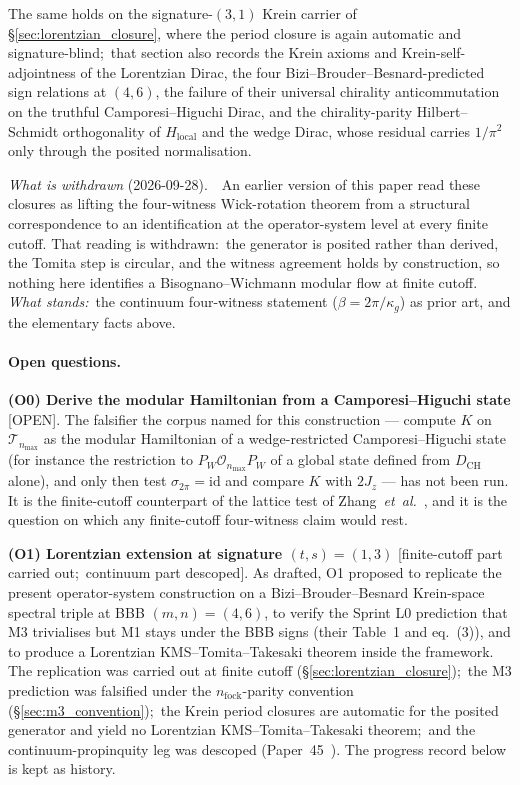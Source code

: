 \documentclass[11pt,a4paper]{article}
\theoremstyle{plain}
\theoremstyle{definition}
\newcommand{\nmax}{n_{\max}}
\newcommand{\Op}{\mathcal{O}}
\newcommand{\Tcal}{\mathcal{T}}
\newcommand{\DCH}{D_{\mathrm{CH}}}
\begin{document}
The same holds on the signature-$(3, 1)$ Krein carrier of
\S\ref{sec:lorentzian_closure}, where the period closure is again
automatic and signature-blind;\ that section also records the Krein axioms
and Krein-self-adjointness of the Lorentzian Dirac, the four
Bizi--Brouder--Besnard-predicted sign relations at $(4, 6)$, the failure
of their universal chirality anticommutation on the truthful
Camporesi--Higuchi Dirac, and the chirality-parity Hilbert--Schmidt
orthogonality of $H_{\mathrm{local}}$ and the wedge Dirac, whose residual
carries $1/\pi^2$ only through the posited normalisation.

\emph{What is withdrawn} (2026-09-28).\ \ An earlier version of this
paper read these closures as lifting the four-witness Wick-rotation
theorem from a structural correspondence to an identification at the
operator-system level at every finite cutoff.  That reading is
withdrawn:\ the generator is posited rather than derived, the Tomita
step is circular, and the witness agreement holds by construction, so
nothing here identifies a Bisognano--Wichmann modular flow at finite
cutoff.  \emph{What stands:}\ the continuum four-witness statement
($\beta = 2\pi/\kappa_g$) as prior art, and the elementary facts above.

\paragraph{Open questions.}

\textbf{(O0) Derive the modular Hamiltonian from a Camporesi--Higuchi
state} [OPEN].  The falsifier the corpus named for this construction
--- compute $K$ on $\Tcal_{\nmax}$ as the modular Hamiltonian of a
wedge-restricted Camporesi--Higuchi state (for instance the
restriction to $P_W \Op_{\nmax} P_W$ of a global state defined from
$\DCH$ alone), and only then test $\sigma_{2\pi} = \mathrm{id}$ and
compare $K$ with $2J_z$ --- has not been run.  It is the finite-cutoff
counterpart of the lattice test of Zhang~\emph{et~al.}~\cite{zhu_casini2020},
and it is the question on which any finite-cutoff four-witness claim
would rest.

\textbf{(O1) Lorentzian extension at signature $(t, s) = (1, 3)$}
[finite-cutoff part carried out;\ continuum part descoped].
As drafted, O1 proposed to replicate the present operator-system
construction on a Bizi--Brouder--Besnard Krein-space spectral triple
at BBB $(m, n) = (4, 6)$, to verify the Sprint L0 prediction that M3
trivialises but M1 stays under the BBB signs (their Table~1 and
eq.~(3)), and to produce a Lorentzian KMS--Tomita--Takesaki theorem
inside the framework.  The replication was carried out at finite cutoff
(\S\ref{sec:lorentzian_closure});\ the M3 prediction was falsified
under the $n_{\mathrm{fock}}$-parity convention
(\S\ref{sec:m3_convention});\ the Krein period closures are automatic
for the posited generator and yield no Lorentzian KMS--Tomita--Takesaki
theorem;\ and the continuum-propinquity leg was descoped
(Paper~45~\cite{paper45}).  The progress record below is kept as
history.
\end{document}
